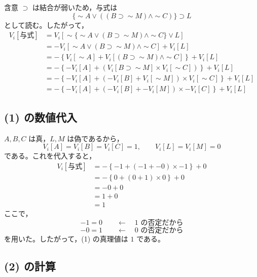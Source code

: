 \documentclass[../main.tex]{subfiles}
\begin{document}
含意 \(\supset\) は結合が弱いため，与式は
\[
  \{\sim A \lor ((B \supset \sim M) \land \sim C)\} \supset L
\]
として読む。したがって，
\[
  \begin{aligned}
  V_i[\text{与式}]
  &=
  V_i[
    \sim\{ \sim A \lor (B \supset \sim M) \land \sim C \}
    \lor L
  ] \\
  &=
  - V_i[
    \sim A \lor (B \supset \sim M) \land \sim C
  ]
  +
  V_i[L] \\
  &=
  -\left\{
    V_i[\sim A]
    +
    V_i[(B \supset \sim M) \land \sim C]
  \right\}
  +
  V_i[L] \\
  &=
  -\left\{
    - V_i[A]
    +
    \left(
      V_i[B \supset \sim M]
      \times
      V_i[\sim C]
    \right)
  \right\}
  +
  V_i[L] \\
  &=
  -\left\{
    - V_i[A]
    +
    \left(
      - V_i[B] + V_i[\sim M]
    \right)
    \times
    V_i[\sim C]
  \right\}
  +
  V_i[L] \\
  &=
  -\left\{
    - V_i[A]
    +
    \left(
      - V_i[B] + - V_i[M]
    \right)
    \times
    - V_i[C]
  \right\}
  +
  V_i[L]
  \end{aligned}
\]

\subsection{(1) の数値代入}

\(A,B,C\) は真，\(L,M\) は偽であるから，
\[
  V_i[A]=V_i[B]=V_i[C]=1,
  \qquad
  V_i[L]=V_i[M]=0
\]
である。これを代入すると，
\[
  \begin{aligned}
  V_i[\text{与式}]
  &=
  -\left\{
    -1
    +
    (-1 + -0) \times -1
  \right\}
  +
  0 \\
  &=
  -\left\{
    0 + (0+1)\times 0
  \right\}
  +
  0 \\
  &=
  -0+0 \\
  &=
  1+0 \\
  &=
  1
  \end{aligned}
\]
ここで，
\[
  -1 = 0
  \qquad
  \leftarrow
  \quad
  1 \text{ の否定だから}
\]
\[
  -0 = 1
  \qquad
  \leftarrow
  \quad
  0 \text{ の否定だから}
\]
を用いた。したがって，(1) の真理値は \(1\) である。

\subsection{(2) の計算}
\end{document}
